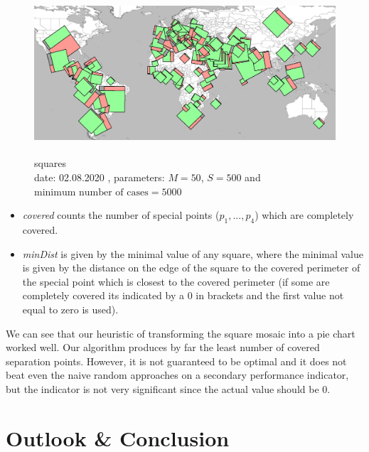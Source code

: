 \documentclass[a4paper,11pt]{article}
\begin{document}
\begin{figure}[!b]
  \centering
  \includegraphics[height=6cm]{assets/squaresEval}
  \caption{squares\\
    date: 02.08.2020  , parameters: $M=50$, $S=500$ and $\text{minimum number of cases}=5000$  }
\end{figure}
\begin{itemize}
  \item \textit{covered} counts the number of special points ($p_1,...,p_4$) which are completely covered.
  \item \textit{minDist} is given by the minimal value of any square, where the minimal value is given by the distance on the edge of the square to the covered perimeter of the special point which is closest to the covered perimeter (if some are completely covered its indicated by a 0 in brackets and the first value not equal to zero is used).
\end{itemize}


We can see that our heuristic of transforming the square mosaic into a pie chart worked well. Our algorithm produces by far the least number of covered separation points. However, it is not guaranteed to be optimal and it does not beat even the naive random approaches on a secondary performance indicator, but the indicator is not very significant since the actual value should be 0.



\section{Outlook \& Conclusion}
\end{document}
